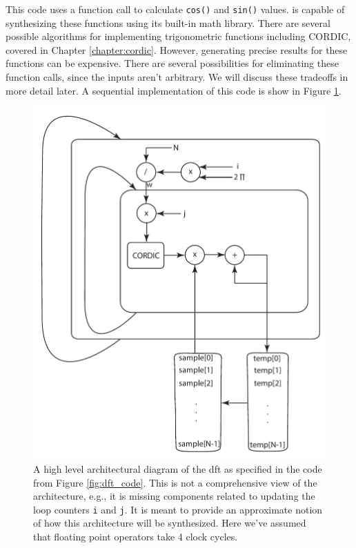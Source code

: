 This code uses a function call to calculate \lstinline|cos()| and \lstinline|sin()| values. \VHLS is capable of synthesizing these functions using its built-in math library. There are several possible algorithms \cite{detrey07hotbm} for implementing trigonometric functions including CORDIC, covered in Chapter \ref{chapter:cordic}.  However, generating precise results for these functions can be expensive.  There are several possibilities for eliminating these function calls, since the inputs aren't arbitrary.  We will discuss these tradeoffs in more detail later.    A sequential implementation of this code is show in Figure \ref{fig:dft_sequential_arch}. 


\begin{figure}
\centering

\includegraphics[width= 0.7 \textwidth]{images/dft_sequential_arch}
\caption{ A high level architectural diagram of the \gls{dft} as specified in the code from Figure \ref{fig:dft_code}. This is not a comprehensive view of the architecture, e.g., it is missing components related to updating the loop counters \lstinline|i| and \lstinline|j|. It is meant to provide an approximate notion of how this architecture will be synthesized.  Here we've assumed that floating point operators take 4 clock cycles.}
\label{fig:dft_sequential_arch}
\end{figure}

